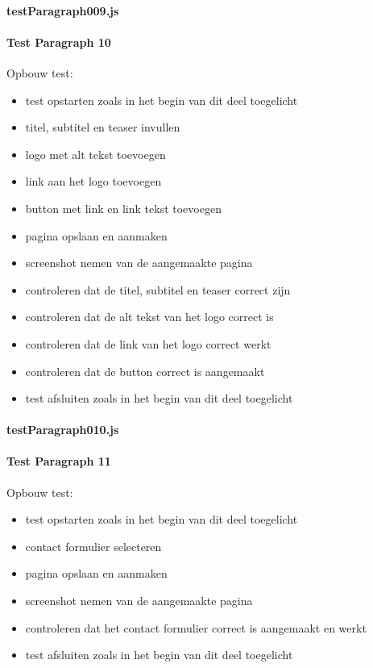 \paragraph{testParagraph009.js}


\clearpage
\paragraph{Test Paragraph 10}
\label{test10}
Opbouw test: 
\begin{itemize}
\item test opstarten zoals in het begin van dit deel toegelicht
\item titel, subtitel en teaser invullen
\item logo met alt tekst toevoegen
\item link aan het logo toevoegen
\item button met link en link tekst toevoegen
\item pagina opslaan en aanmaken
\item screenshot nemen van de aangemaakte pagina
\item controleren dat de titel, subtitel en teaser correct zijn
\item controleren dat de alt tekst van het logo correct is
\item controleren dat de link van het logo correct werkt
\item controleren dat de button correct is aangemaakt
\item test afsluiten zoals in het begin van dit deel toegelicht
\end{itemize}
\paragraph{testParagraph010.js}


\clearpage
\paragraph{Test Paragraph 11}
\label{test11}
Opbouw test: 
\begin{itemize}
\item test opstarten zoals in het begin van dit deel toegelicht
\item contact formulier selecteren
\item pagina opslaan en aanmaken
\item screenshot nemen van de aangemaakte pagina
\item controleren dat het contact formulier correct is aangemaakt en werkt
\item test afsluiten zoals in het begin van dit deel toegelicht
\end{itemize}
